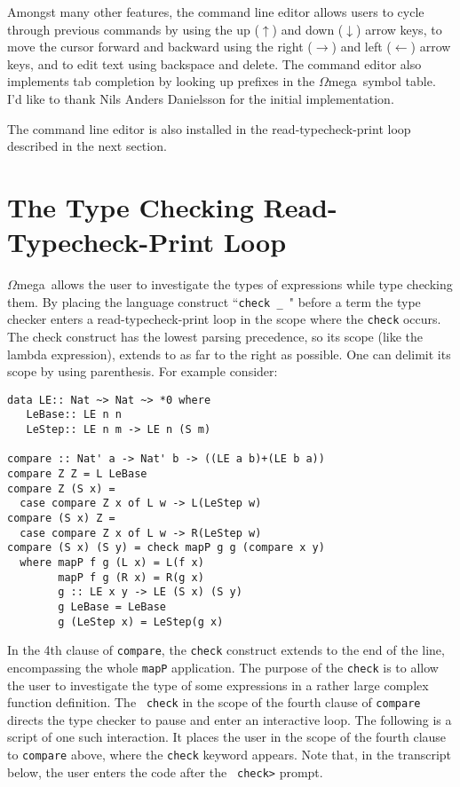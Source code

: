 \documentclass[11pt,twoside]{article}
\newcommand{\om}{$\Omega$mega}
\begin{document}
Amongst many other features, the command line editor allows users
to cycle through previous commands by using the up ($\uparrow$)
and down ($\downarrow$) arrow keys, to move the cursor forward and
backward using the right ($\rightarrow$) and left ($\leftarrow$)
arrow keys, and to edit text using backspace and delete. The
command editor also implements tab completion by looking up
prefixes in the \om\ symbol table. I'd like to thank
Nils Anders Danielsson for the initial implementation.

The command line editor is also installed in the read-typecheck-print
loop described in the next section.


\vspace*{.2in}

\section{The Type Checking Read-Typecheck-Print Loop} \label{typechecker}
\om\ allows the user to investigate the types of expressions while type
checking them. By placing the language construct ``{\tt check \_ }" before a
term the type checker enters a read-typecheck-print loop in the scope where
the {\tt check} occurs. The check construct has the lowest parsing
precedence, so its scope (like the lambda expression), extends to as far to
the right as possible. One can delimit its scope by using parenthesis.
For example consider:

\begin{verbatim}
data LE:: Nat ~> Nat ~> *0 where
   LeBase:: LE n n
   LeStep:: LE n m -> LE n (S m)

compare :: Nat' a -> Nat' b -> ((LE a b)+(LE b a))
compare Z Z = L LeBase
compare Z (S x) =
  case compare Z x of L w -> L(LeStep w)
compare (S x) Z =
  case compare Z x of L w -> R(LeStep w)
compare (S x) (S y) = check mapP g g (compare x y)
  where mapP f g (L x) = L(f x)
        mapP f g (R x) = R(g x)
        g :: LE x y -> LE (S x) (S y)
        g LeBase = LeBase
        g (LeStep x) = LeStep(g x)
\end{verbatim}
In the 4th clause of {\tt compare}, the {\tt check} construct
extends to the end of the line, encompassing the whole {\tt mapP}
application. The purpose of the {\tt check} is to allow the user to investigate the type
of some expressions in a rather large complex function definition. The {\tt
check} in the scope of the fourth clause of {\tt compare} directs the type
checker to pause and enter an interactive loop. The following is a script
of one such interaction. It places the user in the scope of the fourth
clause to {\tt compare} above, where the {\tt check} keyword appears. Note
that, in the transcript below, the user enters the code after the {\tt
check>} prompt.
\end{document}
